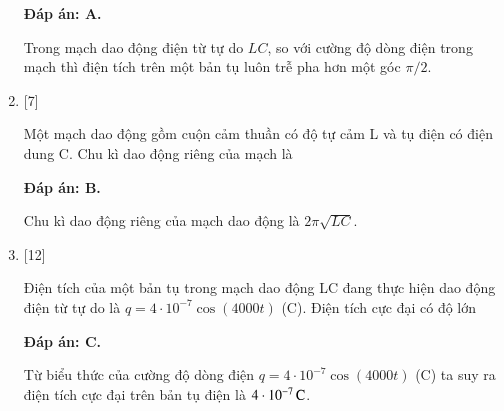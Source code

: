 \begin{enumerate}[label=\bfseries Câu \arabic*:]
	\hideall
	{		\textbf{Đáp án: A.}
		
		Trong mạch dao động điện từ tự do $LC$, so với cường độ dòng điện trong mạch thì điện tích trên một bản tụ luôn trễ pha hơn một góc $\pi/2$.
		
	}
	
	\item {} [7]
	
	{Một mạch dao động gồm cuộn cảm thuần có độ tự cảm L và tụ điện có điện dung C. Chu kì dao động riêng của mạch là
	}
	
	\hideall
	{		\textbf{Đáp án: B.}
		
		Chu kì dao động riêng của mạch dao động là $2\pi \sqrt{LC}$.
		
	}	
	
	\item {} [12]
	
	{Điện tích của một bản tụ trong mạch dao động LC đang thực hiện dao động điện từ tự do là $q = 4\cdot10^{-7} \cos \left( 4000t \right)$ (C). Điện tích cực đại có độ lớn
	}
	
	\hideall
	{		\textbf{Đáp án: C.}
		
		Từ biểu thức của cường độ dòng điện $q = 4\cdot10^{-7} \cos \left( 4000t \right)$ (C) ta suy ra điện tích cực đại trên bản tụ điện là $\xsi{4\cdot10^{-7}}{C}$.
		
}
\end{enumerate}
